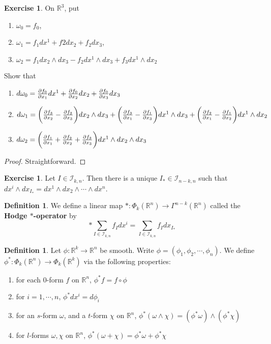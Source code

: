 \documentclass[12pt]{amsart}
\theoremstyle{definition}
\newtheorem{defn}[definition]{Definition}
\newtheorem{ex}[definition]{Exercise}
\newcommand{\om}{\omega}
\newcommand{\R}{\mathbb{R}}
\newcommand{\MI}{\mathcal{I}}
\begin{document}
	\begin{ex}
		On $\R^3$, put 
		\begin{enumerate}
			\item $\om_0 = f_0$, 
			\item $\om_1 = f_1 dx^1 + f2 dx_2 + f_2 dx_3$, 
			\item $\om_2 = f_1dx_2\wedge dx_3 - f_2 dx^1 \wedge dx_3 + f_3 dx^1 \wedge dx_2$
		\end{enumerate} 
		Show that
		\begin{enumerate}
			\item $d\om_0 = \pdv{f_0}{x_1}dx^1 + \pdv{f_0}{x_2}dx_2 + \pdv{f_0}{x_3}dx_3$
			\item $d \om_1 = \bigg(\pdv{f_3}{x_2} - \pdv{f_2}{x_3} \bigg) dx_2 \wedge dx_3 + \bigg( \pdv{f_3}{x_1} - \pdv{f_1}{x_3}\bigg)dx^1 \wedge dx_3 + \bigg( \pdv{f_2}{x_1} - \pdv{f_1}{x_2} \bigg) dx^1 \wedge dx_2$
			\item $d \om_2 = \bigg( \pdv{f_1}{x_1} + \pdv{f_2}{x_2} + \pdv{f_3}{x_3} \bigg) dx^1 \wedge dx_2 \wedge dx_3$ 
		\end{enumerate}
	\end{ex}

	\begin{proof}
		Straightforward.
	\end{proof}

	\begin{ex}
		Let $I \in \MI_{k, n}$. Then there is a unique $I_* \in \MI_{n-k, n}$ such that $dx^i \wedge dx_{I_*} = dx^1 \wedge dx_2 \wedge \cdots \wedge dx^n$.
	\end{ex}
	
	\begin{defn}
		We define a linear map $*:\Phi_k(\R^n) \rightarrow \Gamma^{n-k}(\R^n)$ called the \textbf{Hodge $*$-operator} by $$* \sum\limits_{I \in \MI_{k,n}} f_I dx^i = \sum\limits_{I \in \MI_{k,n}} f_Idx_{I_*}$$
	\end{defn}

	\begin{defn}
		Let $\phi: \R^k \rightarrow \R^n$ be smooth. Write $\phi = (\phi_1, \phi_2, \cdots, \phi_n)$. We define $\phi^*:\Phi_k(\R^n) \rightarrow \Phi_k(\R^k)$ via the following properties: 
		\begin{enumerate}
			\item for each $0$-form $f$ on $\R^n$, $\phi^*f = f \circ \phi$
			\item  for $i = 1, \cdots , n$, $\phi^* dx^i = d\phi_i$ 
			\item for an $s$-form $\om$, and a $t$-form $\chi$ on $\R^n$,  $\phi^* (\om \wedge \chi) = (\phi^*\om) \wedge (\phi^*\chi)$
			\item for $l$-forms $\om, \chi$ on $\R^n$, $\phi^*(\om + \chi) = \phi^*\om + \phi^*\chi$ 
		\end{enumerate}
	\end{defn}
\end{document}
